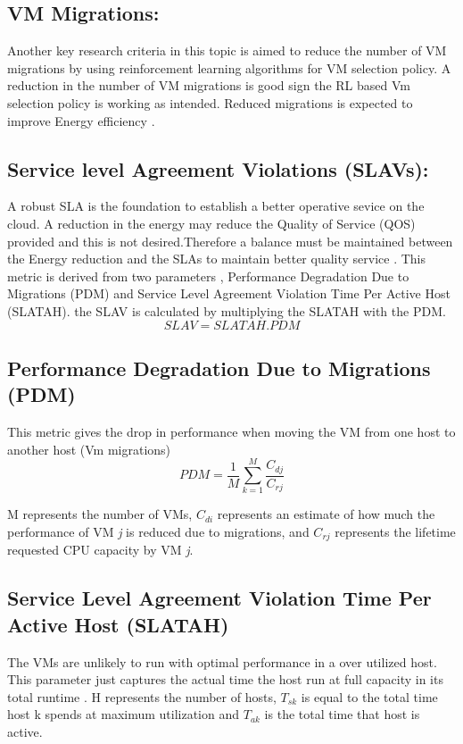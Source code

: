 \documentclass[a4paper,12pt]{Classes/RoboticsLaTeX}
\begin{document}
    \subsection{VM Migrations:}
    Another key research criteria in this topic is aimed to reduce the number of VM migrations by using reinforcement learning algorithms for VM selection policy. A reduction in the number of VM migrations is good sign the RL based Vm selection policy is working as intended. Reduced migrations is expected to improve Energy efficiency .

    \subsection{Service level Agreement Violations (SLAVs):}
    A robust SLA is the foundation to establish a better operative sevice on the cloud. A reduction in the energy may reduce the Quality of Service (QOS) provided and this is not desired.Therefore a balance must be maintained between the Energy reduction and the SLAs to maintain better quality service . This metric is derived from two parameters , Performance Degradation Due to Migrations (PDM) and Service Level Agreement Violation Time Per Active Host (SLATAH).  the SLAV is calculated by multiplying the SLATAH with the PDM.
        \begin{equation}
        SLAV = SLATAH. PDM
        \end{equation}
        
    \subsection{Performance Degradation Due to Migrations  (PDM)}
     This metric gives the  drop in performance when moving the VM from one host to another host (Vm migrations) 
     \begin{equation}
    PDM = \frac{1}{M} \sum_{k=1}^{M} \frac{C_{dj}}{C_{rj}}
    \end{equation}

    M represents the number of VMs, $C_{di}$ represents an estimate of how much the performance of VM \textit{j} is reduced due to migrations, and $C_{rj}$ represents the lifetime requested CPU capacity by VM \textit{j}.

    \subsection{Service Level Agreement Violation Time Per Active Host (SLATAH)}
     The VMs are unlikely to run with optimal performance in a over utilized host. This parameter just captures the actual time the host run at full capacity in its total runtime .
    H represents the number of hosts, $T_{sk}$ is equal to the total time host k spends at maximum utilization and $T_{ak}$ is the total time that host is active.
\end{document}
